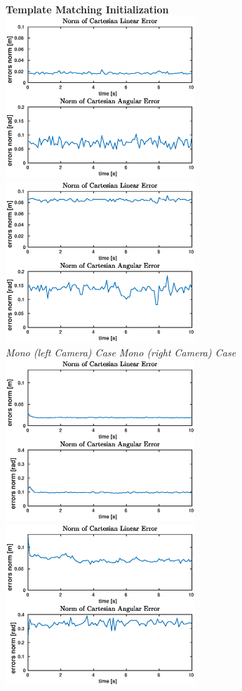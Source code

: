 \begin{figure}
	\centering
	\textbf{Template Matching Initialization}\\
	\vspace*{20px}
	\includegraphics[width=7.15cm]{tracking/templ-mono-left.eps}
	\includegraphics[width=7.15cm]{tracking/templ-mono-right.eps}\\
	\hspace*{15px}\textit{Mono (left Camera) Case} \hspace{55px} \textit{Mono (right Camera) Case}\\
	\vspace{30px}
	\includegraphics[width=7.15cm]{tracking/templ-stereo.eps}
	\includegraphics[width=7.15cm]{tracking/templ-depth.eps}\\

\end{figure}
